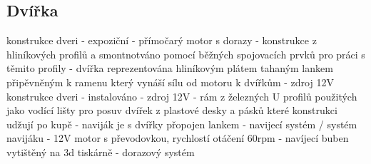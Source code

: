 
\subsection{Dvířka}\label{subsec:dvirka}
konstrukce dveri - expoziční \newline
- přímočarý motor s dorazy\newline
- konstrukce z hliníkových profilů a smontnotváno pomocí běžných spojovacích prvků pro práci s těmito profily\newline
- dvířka reprezentována hliníkovým plátem tahaným lankem připěvněným k ramenu který vynáší sílu od motoru k dvířkům\newline
- zdroj 12V \newline
konstrukce dveri - instalováno\newline
- zdroj 12V\newline
- rám z železných U profilů použitých jako vodící lišty pro posuv dvířek z plastové desky a pásků které konstrukci udžují po kupě\newline
- naviják je s dvířky přopojen lankem\newline
- navijecí systém / systém navijáku\newline
- 12V motor s převodovkou, rychlostí otáčení 60rpm\newline
- navíjecí buben vytištěný na 3d tiskárně\newline
- dorazový systém\newline